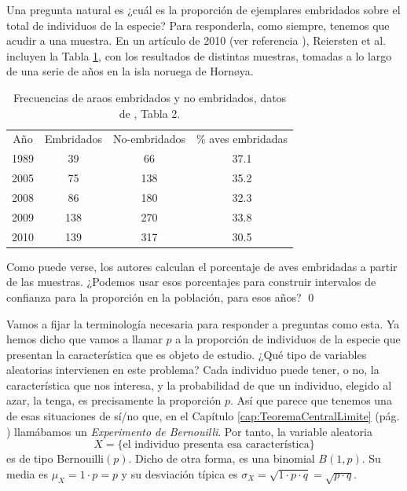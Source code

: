 \begin{ejemplo}
Una pregunta natural es ¿cuál es la proporción de ejemplares embridados sobre el total de individuos de la especie? Para responderla, como siempre, tenemos que acudir a una muestra. En un artículo de 2010 (ver referencia \cite{reiertsen2012climate}), Reiersten et al. incluyen la Tabla \ref{cap08:tabla:PaperFrecuenciaAraosEmbridados}, con los resultados de distintas muestras, tomadas a lo largo de una serie de años en la isla noruega de Horn{\o}ya.

    \begin{table}[htb]
    \begin{center}
    \begin{tabular}{cccc}
        Año&Embridados&No-embridados&\% aves embridadas\\
        1989&39&66&37.1\\
        2005&75&138&35.2\\
        2008&86&180&32.3\\
        2009&138&270&33.8\\
        2010&139&317&30.5
    \end{tabular}
    \caption{Frecuencias de araos embridados y no embridados, datos de \cite{reiertsen2012climate}, Tabla 2.}
    \label{cap08:tabla:PaperFrecuenciaAraosEmbridados}
    \end{center}
    \end{table}
    Como puede verse, los autores calculan el porcentaje de aves embridadas a partir de las muestras. ¿Podemos usar esos porcentajes para construir intervalos de confianza para la proporción en la población, para esos años?
\qed
\end{ejemplo}

Vamos a fijar la terminología necesaria para responder a preguntas como esta. Ya hemos dicho que
vamos a llamar $p$ a la proporción de individuos de la especie que presentan la característica que
es objeto de estudio. ¿Qué tipo de variables aleatorias intervienen en este problema? Cada
individuo puede tener, o no, la característica que nos interesa, y la probabilidad de que un
individuo, elegido al azar, la tenga, es precisamente la proporción $p$. Así que parece que tenemos
una de esas situaciones de sí/no que, en el Capítulo \ref{cap:TeoremaCentralLimite} (pág.
\pageref{cap05:def:ExperimentoBernouilli}) llamábamos un {\em Experimento de Bernouilli}. Por
tanto, la variable aleatoria
\[X=\{\mbox{el individuo presenta esa característica}\}\]
es de tipo Bernouilli$(p)$. Dicho de otra forma, es una binomial $B(1,p)$. Su media es
$\mu_X=1\cdot p=p$ y su desviación típica es $\sigma_X=\sqrt{1\cdot p\cdot q}=\sqrt{p\cdot q}$.

